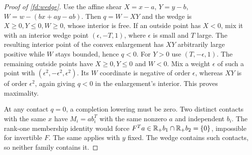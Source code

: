 \begin{proof}[Proof of \cref{fd:wedge}]
\label{fd:wedge-proof}
Use the affine shear
$X=x-a$, $Y=y-b$, $W=w-(bx+ay-ab)$.
Then $q=W-XY$ and the wedge is
$X\ge0,Y\le0,W\ge0$, whose interior is free.
If an outside point has $X<0$, mix it with
an interior wedge point $(\epsilon,-T,1)$,
where $\epsilon$ is small and $T$ large.
The resulting interior point of the convex
enlargement has $XY$ arbitrarily large
positive while $W$ stays bounded, hence $q<0$.
For $Y>0$ use $(T,-\epsilon,1)$.
The remaining outside points have $X\ge0,Y\le0$
and $W<0$. Mix a weight $\epsilon$ of such a
point with $(\epsilon^2,-\epsilon^2,\epsilon^2)$.
Its $W$ coordinate is negative of order
$\epsilon$, whereas $XY$ is of order
$\epsilon^2$, again giving $q<0$ in the
enlargement's interior. This proves maximality.

At any contact $q=0$, a completion lowering
must be zero. Two distinct contacts with the
same $x$ have $M_i=a b_i^T$ with the same
nonzero $a$ and independent $b_i$.
The rank-one membership identity would force
$F^Ta\in\mathbb R_+b_1\cap\mathbb R_+b_2=\{0\}$, impossible
for invertible $F$. The same applies with
$y$ fixed. The wedge contains such contacts,
so neither family contains it.
\end{proof}
